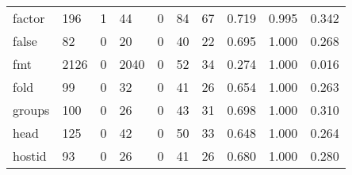 \begin{longtable}{lp{1.3cm}p{1.3cm}p{1.3cm}p{1.3cm}p{1.3cm}p{1.3cm}p{1.3cm}p{1.3cm}p{1.3cm}}
factor    &                    196 &                                  1 &                                44 &                                0 &                                84 &                              67 &                                0.719 &                                  0.995 &                                0.342 \\
false     &                     82 &                                  0 &                                20 &                                0 &                                40 &                              22 &                                0.695 &                                  1.000 &                                0.268 \\
fmt       &                   2126 &                                  0 &                              2040 &                                0 &                                52 &                              34 &                                0.274 &                                  1.000 &                                0.016 \\
fold      &                     99 &                                  0 &                                32 &                                0 &                                41 &                              26 &                                0.654 &                                  1.000 &                                0.263 \\
groups    &                    100 &                                  0 &                                26 &                                0 &                                43 &                              31 &                                0.698 &                                  1.000 &                                0.310 \\
head      &                    125 &                                  0 &                                42 &                                0 &                                50 &                              33 &                                0.648 &                                  1.000 &                                0.264 \\
hostid    &                     93 &                                  0 &                                26 &                                0 &                                41 &                              26 &                                0.680 &                                  1.000 &                                0.280 \\

\end{longtable}
